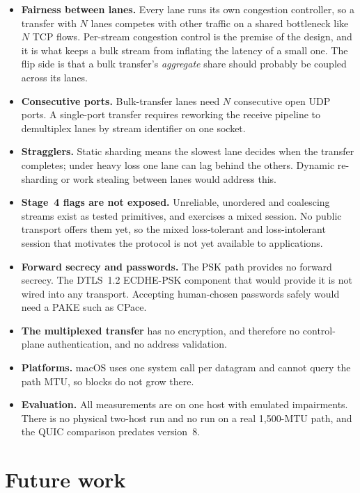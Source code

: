 \begin{itemize}
  \item \textbf{Fairness between lanes.} Every lane runs its own congestion controller, so a transfer with $N$
    lanes competes with other traffic on a shared bottleneck like $N$ TCP flows. Per-stream congestion control
    is the premise of the design, and it is what keeps a bulk stream from inflating the latency of a small one.
    The flip side is that a bulk transfer's \emph{aggregate} share should probably be coupled across its lanes.
  \item \textbf{Consecutive ports.} Bulk-transfer lanes need $N$ consecutive open UDP ports. A single-port
    transfer requires reworking the receive pipeline to demultiplex lanes by stream identifier on one socket.
  \item \textbf{Stragglers.} Static sharding means the slowest lane decides when the transfer completes; under
    heavy loss one lane can lag behind the others. Dynamic re-sharding or work stealing between lanes would
    address this.
  \item \textbf{Stage~4 flags are not exposed.} Unreliable, unordered and coalescing streams exist as tested
    primitives, and  exercises a mixed session. No public transport offers them yet, so the
    mixed loss-tolerant and loss-intolerant session that motivates the protocol is not yet available to
    applications.
  \item \textbf{Forward secrecy and passwords.} The PSK path provides no forward secrecy. The DTLS~1.2 ECDHE-PSK
    component that would provide it is not wired into any transport. Accepting human-chosen passwords safely
    would need a PAKE such as CPace.
  \item \textbf{The multiplexed transfer} has no encryption, and therefore no control-plane authentication, and
    no address validation.
  \item \textbf{Platforms.} macOS uses one system call per datagram and cannot query the path MTU, so blocks do
    not grow there.
  \item \textbf{Evaluation.} All measurements are on one host with emulated impairments. There is no physical
    two-host run and no run on a real 1,500-MTU path, and the QUIC comparison predates version~8.
\end{itemize}

\section{Future work}

